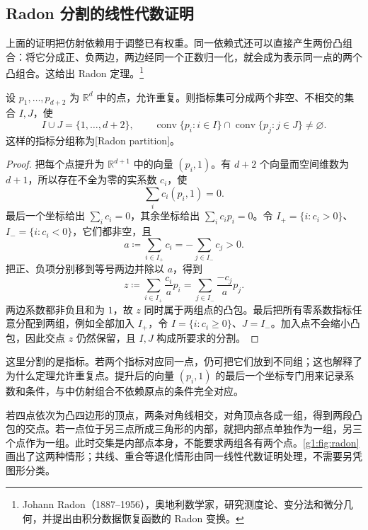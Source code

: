 \subsection{Radon 分割的线性代数证明}
\label{g1:subsec:0302:02}

上面的证明把仿射依赖用于调整已有权重。同一依赖式还可以直接产生两份凸组合：将它分成正、负两边，两边经同一个正数归一化，就会成为表示同一点的两个凸组合。这给出 Radon 定理。\footnote{Johann Radon（1887--1956），奥地利数学家，研究测度论、变分法和微分几何，并提出由积分数据恢复函数的 Radon 变换。}

\begin{theorem}[Radon 分割]\label{g1:thm:radon}
	设 \(p_1,\ldots,p_{d+2}\) 为 \(\mathbb R^d\) 中的点，允许重复。则指标集可分成两个非空、不相交的集合 \(I,J\)，使
	\[
		I\cup J=\{1,\ldots,d+2\},\qquad
		\operatorname{conv}\{p_i:i\in I\}\cap\operatorname{conv}\{p_j:j\in J\}\ne\varnothing.
	\]
	这样的指标分组称为[Radon partition]。
\end{theorem}
\begin{proof}
	把每个点提升为 \(\mathbb R^{d+1}\) 中的向量 \((p_i,1)\)。有 \(d+2\) 个向量而空间维数为 \(d+1\)，所以存在不全为零的实系数 \(c_i\)，使
	\[
		\sum_i c_i(p_i,1)=0.
	\]
	最后一个坐标给出 \(\sum_i c_i=0\)，其余坐标给出 \(\sum_i c_i p_i=0\)。令 \(I_+=\{i:c_i>0\}\)、\(I_-=\{i:c_i<0\}\)，它们都非空，且
	\[
		a\coloneqq\sum_{i\in I_+}c_i=-\sum_{j\in I_-}c_j>0.
	\]
	把正、负项分别移到等号两边并除以 \(a\)，得到
	\[
		z\coloneqq\sum_{i\in I_+}\frac{c_i}{a}p_i
		=\sum_{j\in I_-}\frac{-c_j}{a}p_j.
	\]
	两边系数都非负且和为 \(1\)，故 \(z\) 同时属于两组点的凸包。最后把所有零系数指标任意分配到两组，例如全部加入 \(I_+\)，令 \(I=\{i:c_i\ge0\}\)、\(J=I_-\)。加入点不会缩小凸包，因此交点 \(z\) 仍然保留，且 \(I,J\) 构成所要求的分割。
\end{proof}

这里分割的是指标。若两个指标对应同一点，仍可把它们放到不同组；这也解释了为什么定理允许重复点。提升后的向量 \((p_i,1)\) 的最后一个坐标专门用来记录系数和条件，与中仿射组合不依赖原点的条件完全对应。

\begin{example}\label{g1:exm:radon-plane}
	若四点依次为凸四边形的顶点，两条对角线相交，对角顶点各成一组，得到两段凸包的交点。若一点位于另三点所成三角形的内部，就把内部点单独作为一组，另三个点作为一组。此时交集是内部点本身，不能要求两组各有两个点。\cref{g1:fig:radon}画出了这两种情形；共线、重合等退化情形由同一线性代数证明处理，不需要另凭图形分类。
\end{example}

